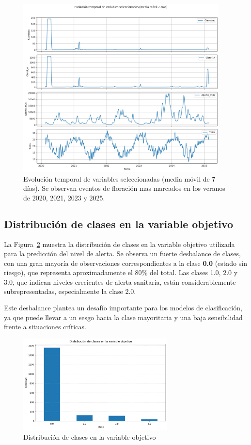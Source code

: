\documentclass[11pt]{report}
\begin{document}
\begin{figure}[H]
    \centering
    \includegraphics[width=0.95\textwidth]{Imagenes/Series_Temporales.png}
    \caption{Evolución temporal de variables seleccionadas (media móvil de 7 días). Se observan eventos de floración mas marcados en los veranos de 2020, 2021, 2023 y 2025.}
    \label{fig:series-temporales}
\end{figure}

\subsection{Distribución de clases en la variable objetivo}

La Figura~\ref{fig:distribucion-clases} muestra la distribución de clases en la variable objetivo utilizada para la predicción del nivel de alerta. Se observa un fuerte desbalance de clases, con una gran mayoría de observaciones correspondientes a la clase \textbf{0.0} (estado sin riesgo), que representa aproximadamente el 80\% del total. Las clases 1.0, 2.0 y 3.0, que indican niveles crecientes de alerta sanitaria, están considerablemente subrepresentadas, especialmente la clase 2.0.

Este desbalance plantea un desafío importante para los modelos de clasificación, ya que puede llevar a un sesgo hacia la clase mayoritaria y una baja sensibilidad frente a situaciones críticas.

\begin{figure}[H]
\centering
\includegraphics[width=0.7\textwidth]{Imagenes/Distribucion_clases.png}
\caption{Distribución de clases en la variable objetivo}
\label{fig:distribucion-clases}
\end{figure}
\end{document}
